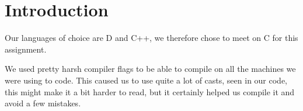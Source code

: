 \section{Introduction}
Our languages of choice are D and C++, we therefore chose to meet on C for this assignment. 

We used pretty harsh compiler flags to be able to compile on all the machines we were using to code. This caused us to use quite a lot of casts, seen in our code, this might make it a bit harder to read, but it certainly helped us compile it and avoid a few mistakes. 
